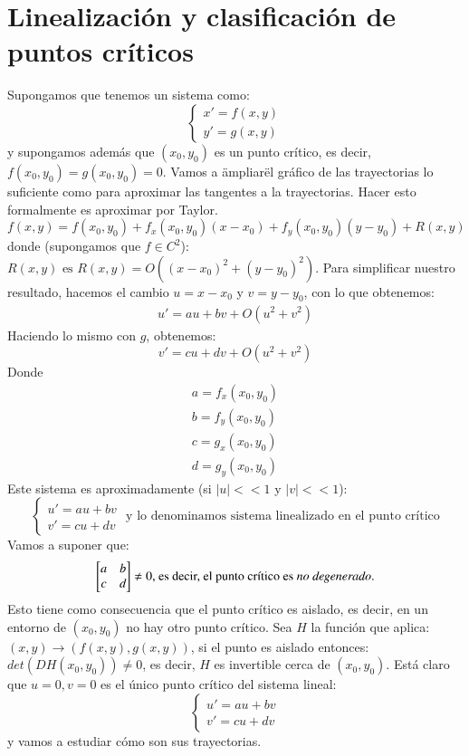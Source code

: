 \section{Linealizaci\'on y clasificaci\'on de puntos cr\'iticos}
Supongamos que tenemos un sistema como:
$$
    \begin{cases}
        x' = f(x, y)\\
        y' = g(x, y)
    \end{cases}
$$
y supongamos además que $(x_0, y_0)$ es un punto crítico, es decir, $f(x_0, y_0) = g(x_0, y_0) = 0$. Vamos a \"ampliar\" el gráfico de las trayectorias lo suficiente como para aproximar las tangentes a la trayectorias. Hacer esto formalmente es aproximar por Taylor.
$$
    f(x, y) = f(x_0, y_0) + f_x(x_0, y_0)(x-x_0) + f_y(x_0, y_0)(y-y_0) + R(x, y)
$$
donde (supongamos que $f \in C^2$): $ R(x, y) \text{ es } R(x, y) = O((x-x_0)^2 + (y-y_0)^2)$. Para simplificar nuestro resultado, hacemos el cambio $u = x-x_0$ y $v = y-y_0$, con lo que obtenemos:
\begin{gather*}
    u' = au + bv + O(u^2+v^2)
\end{gather*}
Haciendo lo mismo con $g$, obtenemos:
$$
    v' = cu + dv + O(u^2 + v^2)
$$
Donde
    \begin{gather*}
        a = f_x(x_0, y_0)\\
        b = f_y(x_0, y_0)\\
        c = g_x(x_0, y_0)\\
        d = g_y(x_0, y_0)
    \end{gather*}
Este sistema es aproximadamente (si $|u|<<1$ y $|v|<<1$):
$$
    \begin{cases}
        u' = au + bv\\
        v' = cu + dv
    \end{cases} \text{ y lo denominamos sistema linealizado en el punto crítico}
$$
Vamos a suponer que:
$$
    \mx{a &b\\ c &d} \neq 0\text{, es decir, el punto crítico es \textit{no degenerado}.}
$$
Esto tiene como consecuencia que el punto crítico es aislado, es decir, en un entorno de $(x_0, y_0)$ no hay otro punto crítico.
Sea $H$ la función que aplica: $(x, y) \to (f(x, y), g(x, y))$, si el punto es aislado entonces: $det(DH(x_0, y_0)) \neq 0$, es decir, $H$ es invertible cerca de $(x_0, y_0)$. Está claro que $u=0, v=0$ es el único punto crítico del sistema lineal:
$$
    \begin{cases}
        u' = au + bv\\
        v' = cu + dv
    \end{cases}
$$
y vamos a estudiar cómo son sus trayectorias.
